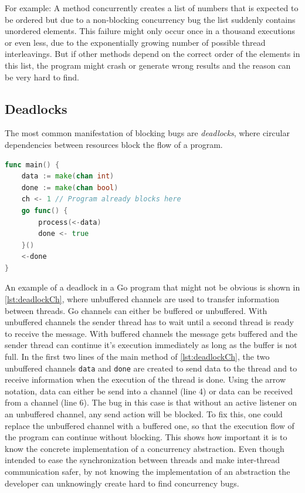 \documentclass[conference]{IEEEtran}
\begin{document}
For example: A method concurrently creates a list of numbers that is expected to be ordered but due to a non-blocking concurrency bug the list suddenly contains unordered elements.
This failure might only occur once in a thousand executions or even less, due to the exponentially growing number of possible thread interleavings.
But if other methods depend on the correct order of the elements in this list, the program might crash or generate wrong results and the reason can be very hard to find.

\subsection{Deadlocks}

The most common manifestation of blocking bugs are \emph{deadlocks}, where circular dependencies between resources block the flow of a program.

\begin{lstlisting}[float=h, language=Go, label=lst:deadlockCh, caption={Deadlock caused by misuse of an \emph{unbuffered Channel}}]
func main() {
    data := make(chan int)
    done := make(chan bool)
    ch <- 1 // Program already blocks here
    go func() {
        process(<-data)
        done <- true
    }()
    <-done
}
\end{lstlisting}

An example of a deadlock in a Go program that might not be obvious is shown in \cref{lst:deadlockCh}, where unbuffered channels are used to transfer information between threads.
Go channels can either be buffered or unbuffered.
With unbuffered channels the sender thread has to wait until a second thread is ready to receive the message.
With buffered channels the message gets buffered and the sender thread can continue it's execution immediately as long as the buffer is not full.
In the first two lines of the main method of \cref{lst:deadlockCh}, the two unbuffered channels \lstinline{data} and \lstinline{done} are created to send data to the thread and to receive information when the execution of the thread is done.
Using the arrow notation, data can either be send into a channel (line 4) or data can be received from a channel (line 6).
The bug in this case is that without an active listener on an unbuffered channel, any send action will be blocked.
To fix this, one could replace the unbuffered channel with a buffered one, so that the execution flow of the program can continue without blocking.
This shows how important it is to know the concrete implementation of a concurrency abstraction.
Even though intended to ease the synchronization between threads and make inter-thread communication safer, by not knowing the implementation of an abstraction the developer can unknowingly create hard to find concurrency bugs.
\end{document}
